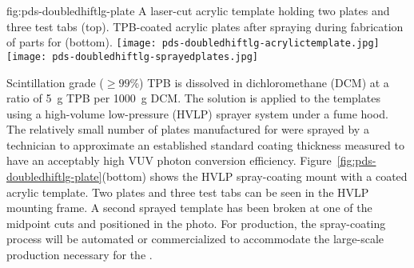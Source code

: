 \begin{dunefigure}
{fig:pds-doubledhiftlg-plate}
{A laser-cut acrylic template holding two plates and three test tabs (top). TPB-coated acrylic plates after spraying during fabrication of parts for  (bottom).}
    \texttt{[image: pds-doubledhiftlg-acrylictemplate.jpg]}\\
    \vspace{0.3cm}
    \texttt{[image: pds-doubledhiftlg-sprayedplates.jpg]}
\end{dunefigure}

Scintillation grade ($\ge 99$\%) TPB is dissolved in dichloromethane (DCM) at a ratio of \SI{5}{g} TPB per \SI{1000}{g} DCM. The solution is applied to the templates using a high-volume low-pressure (HVLP) sprayer system under a fume hood. The relatively small number of plates manufactured for  were sprayed by a technician to approximate an established standard coating thickness measured to have an acceptably high VUV photon conversion efficiency. Figure~\ref{fig:pds-doubledhiftlg-plate}(bottom) shows the HVLP spray-coating mount with a coated acrylic template. Two plates and three test tabs can be seen in the HVLP mounting frame. A second sprayed template has been broken at one of the midpoint cuts and positioned in the photo. For  production, the spray-coating process will be automated or commercialized to accommodate the large-scale production necessary for the  .

